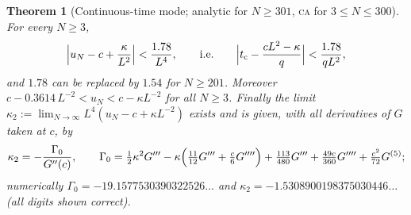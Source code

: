 \documentclass[11pt,a4paper]{article}
\newtheorem{theorem}{Theorem}[section]
\theoremstyle{definition}
\theoremstyle{remark}
\newcommand{\CA}{\textsc{ca}}
\begin{document}
\begin{theorem}[Continuous-time mode; analytic for $N\ge301$, \CA{} for $3\le N\le300$]\label{thm:cont}
For every $N\ge3$,
\begin{equation}\label{eq:contbound}
  \Bigl|u_N-c+\frac{\kappa}{L^2}\Bigr|<\frac{1.78}{L^4},\qquad\text{i.e.}\qquad
  \Bigl|t_{\rm c}-\frac{cL^2-\kappa}{q}\Bigr|<\frac{1.78}{qL^2},
\end{equation}
and $1.78$ can be replaced by $1.54$ for $N\ge201$. Moreover $c-0.3614\,L^{-2}<u_N<c-\kappa L^{-2}$ for all $N\ge3$.
Finally the limit $\kappa_2:=\lim_{N\to\infty}L^4(u_N-c+\kappa L^{-2})$ exists and is given, with all derivatives of $G$
taken at $c$, by
\begin{equation}\label{eq:kappa2}
 \kappa_2=-\frac{\Gamma_0}{G''(c)},\qquad
 \Gamma_0=\tfrac12\kappa^2G'''-\kappa\Bigl(\tfrac{11}{12}G'''+\tfrac c6G''''\Bigr)
   +\tfrac{113}{480}G'''+\tfrac{49c}{360}G''''+\tfrac{c^2}{72}G^{(5)} ;
\end{equation}
numerically $\Gamma_0=-19.1577530390322526\ldots$ and $\kappa_2=-1.5308900198375030446\ldots$ (all digits shown correct).
\end{theorem}
\end{document}
